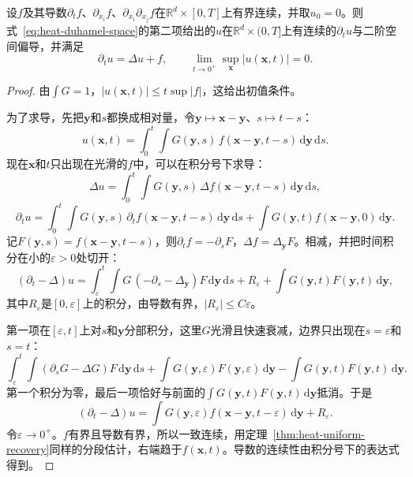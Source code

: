 \begin{theorem}[全空间的Duhamel公式]
\label{thm:heat-duhamel-space}
设$f$及其导数$\partial_tf$、$\partial_{x_i}f$、$\partial_{x_i}\partial_{x_j}f$在$\mathbb{R}^{d}\times[0,T]$上有界连续，并取$u_0=0$。则式~\eqref{eq:heat-duhamel-space}的第二项给出的$u$在$\mathbb{R}^{d}\times(0,T]$上有连续的$\partial_tu$与二阶空间偏导，并满足
\begin{equation}
 \partial_tu=\Delta u+f,\qquad \lim_{t\to0^+}\sup_{\bm{x}}\lvert u(\bm{x},t)\rvert=0 .
 \label{eq:heat-duhamel-solves}
\end{equation}
\end{theorem}

\begin{proof}
由$\int G=1$，$\lvert u(\bm{x},t)\rvert\leq t\sup\lvert f\rvert$，这给出初值条件。

为了求导，先把$\bm{y}$和$s$都换成相对量，令$\bm{y}\mapsto\bm{x}-\bm{y}$、$s\mapsto t-s$：
\[
 u(\bm{x},t)=\int_0^t\!\!\int G(\bm{y},s)\,f(\bm{x}-\bm{y},t-s)\,\mathrm{d}\bm{y}\,\mathrm{d}s .
\]
现在$\bm{x}$和$t$只出现在光滑的$f$中，可以在积分号下求导：
\[
 \Delta u=\int_0^t\!\!\int G(\bm{y},s)\,\Delta f(\bm{x}-\bm{y},t-s)\,\mathrm{d}\bm{y}\,\mathrm{d}s,
\]
\[
 \partial_tu=\int_0^t\!\!\int G(\bm{y},s)\,\partial_tf(\bm{x}-\bm{y},t-s)\,\mathrm{d}\bm{y}\,\mathrm{d}s+\int G(\bm{y},t)f(\bm{x}-\bm{y},0)\,\mathrm{d}\bm{y} .
\]
记$F(\bm{y},s)=f(\bm{x}-\bm{y},t-s)$，则$\partial_tf=-\partial_sF$，$\Delta f=\Delta_{\bm{y}}F$。相减，并把时间积分在小的$\varepsilon>0$处切开：
\[
 (\partial_t-\Delta)u=\int_\varepsilon^t\!\!\int G\,(-\partial_s-\Delta_{\bm{y}})F\,\mathrm{d}\bm{y}\,\mathrm{d}s+R_\varepsilon+\int G(\bm{y},t)F(\bm{y},t)\,\mathrm{d}\bm{y},
\]
其中$R_\varepsilon$是$[0,\varepsilon]$上的积分，由导数有界，$\lvert R_\varepsilon\rvert\leq C\varepsilon$。

第一项在$[\varepsilon,t]$上对$s$和$\bm{y}$分部积分，这里$G$光滑且快速衰减，边界只出现在$s=\varepsilon$和$s=t$：
\[
 \int_\varepsilon^t\!\!\int(\partial_sG-\Delta G)F\,\mathrm{d}\bm{y}\,\mathrm{d}s+\int G(\bm{y},\varepsilon)F(\bm{y},\varepsilon)\,\mathrm{d}\bm{y}-\int G(\bm{y},t)F(\bm{y},t)\,\mathrm{d}\bm{y} .
\]
第一个积分为零，最后一项恰好与前面的$\int G(\bm{y},t)F(\bm{y},t)\,\mathrm{d}\bm{y}$抵消。于是
\[
 (\partial_t-\Delta)u=\int G(\bm{y},\varepsilon)f(\bm{x}-\bm{y},t-\varepsilon)\,\mathrm{d}\bm{y}+R_\varepsilon .
\]
令$\varepsilon\to0^+$。$f$有界且导数有界，所以一致连续，用定理~\ref{thm:heat-uniform-recovery}同样的分段估计，右端趋于$f(\bm{x},t)$。导数的连续性由积分号下的表达式得到。
\end{proof}

